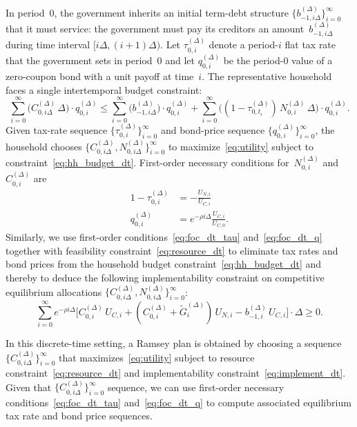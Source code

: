 \documentclass[12pt]{article}
\begin{document}
{{{In period~0, the government inherits an initial term-debt structure $\{b_{-1,i\Delta}^{(\Delta)}\}_{i=0}^\infty$ that it must service: the government must pay its creditors an amount~$b_{-1,i\Delta}^{(\Delta)}$ during time interval $[i\Delta, (i+1)\Delta)$. Let $\tau_{0,i}^{(\Delta)}$ denote a period-$i$ flat tax rate that the government sets in period~0 and let $q_{0,i}^{(\Delta)}$ be the period-0 value of a zero-coupon bond with a unit payoff at time~$i$. The representative household faces a single intertemporal budget constraint:
\begin{equation}\label{eq:hh_budget_dt}
\sum_{i=0}^\infty \bigl(C_{0,i\Delta}^{(\Delta)}\, \Delta\bigr) \cdot q_{0,i}^{(\Delta)} \le \sum_{i=0}^\infty \bigl(b_{-1,i\Delta}^{(\Delta)}\bigr) \cdot q_{0,i}^{(\Delta)} + \sum_{i=0}^\infty \bigl((1-\tau_{0,t_i}^{(\Delta)})\, N_{0,i}^{(\Delta)}\, \Delta\bigr) \cdot q_{0,i}^{(\Delta)}.
\end{equation}
Given tax-rate sequence $\{\tau_{0,i}^{(\Delta)}\}_{i=0}^\infty$ and bond-price sequence $\{q_{0,i}^{(\Delta)}\}_{i=0}^\infty$, the household chooses $\{C_{0,i\Delta}^{(\Delta)}, N_{0,i\Delta}^{(\Delta)}\}_{i=0}^\infty$ to maximize~\eqref{eq:utility} subject to constraint~\eqref{eq:hh_budget_dt}. First-order necessary conditions for~$N_{0,i}^{(\Delta)}$ and~$C_{0,i}^{(\Delta)}$ are
\begin{align}
1-\tau_{0,i}^{(\Delta)} &= -\frac{U_{N,i}}{U_{C,i}} \label{eq:foc_dt_tau}\\
q_{0,i}^{(\Delta)} &= e^{-\rho i\Delta}\frac{U_{C,i}}{U_{C,0}}. \label{eq:foc_dt_q}
\end{align}
{Similarly}, we use first-order conditions~\eqref{eq:foc_dt_tau} and~\eqref{eq:foc_dt_q} together with feasibility constraint~\eqref{eq:resource_dt} to eliminate tax rates and bond prices from the household budget constraint~\eqref{eq:hh_budget_dt} and thereby to deduce the following implementability constraint on competitive equilibrium allocations $\{C_{0,i\Delta}^{(\Delta)}, N_{0,i\Delta}^{(\Delta)}\}_{i=0}^\infty$:
\begin{equation}\label{eq:implement_dt}
\sum_{i=0}^\infty e^{-\rho i\Delta}\bigl[C_{0,i}^{(\Delta)}\, U_{C,i} + (C_{0,i}^{(\Delta)}+\tilde{G}_i^{(\Delta)})\, U_{N,i} - b_{-1,i}^{(\Delta)}\, U_{C,i}\bigr] \cdot \Delta \ge 0.
\end{equation}

In this discrete-time setting, a Ramsey plan is obtained by choosing a sequence $\{C_{0,i\Delta}^{(\Delta)}\}_{i=0}^\infty$ that maximizes~\eqref{eq:utility} subject to resource constraint~\eqref{eq:resource_dt} and implementability constraint~\eqref{eq:implement_dt}. Given that $\{C_{0,i\Delta}^{(\Delta)}\}_{i=0}^\infty$ sequence, we can use first-order necessary conditions~\eqref{eq:foc_dt_tau} and~\eqref{eq:foc_dt_q} to compute associated equilibrium tax rate and bond price sequences.

}}}
\end{document}

